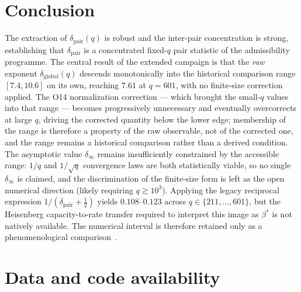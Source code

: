 \documentclass[11pt,a4paper]{article}
\theoremstyle{definition}
\newcommand{\dpair}{\delta_{\mathrm{pair}}}
\newcommand{\bstar}{\beta^{*}}
\begin{document}
  \section{Conclusion}

    The extraction of $\dpair(q)$ is robust and the inter-pair concentration is strong,
    establishing that $\dpair$ is a concentrated fixed-$q$ pair statistic of the admissibility
    programme.
    The central result of the extended campaign is that the \emph{raw} exponent
    $\delta_{\mathrm{global}}(q)$ descends monotonically into the historical comparison range
    $[7.4, 10.6]$ on its own, reaching $7.61$ at $q = 601$, with no finite-size correction applied.
    The O14 normalization correction --- which brought the small-$q$ values into that range ---
    becomes progressively unnecessary and eventually overcorrects at large $q$, driving the
    corrected quantity below the lower edge; membership of the range is therefore a property of
    the raw observable, not of the corrected one, and the range remains a historical comparison
    rather than a derived condition.
    The asymptotic value $\delta_\infty$ remains insufficiently constrained by the accessible
    range: $1/q$ and $1/\sqrt{q}$ convergence laws are both statistically viable, so no single
    $\delta_\infty$ is claimed, and the discrimination of the finite-size form is left as the open
    numerical direction (likely requiring $q \gtrsim 10^3$).
    Applying the legacy reciprocal expression $1/(\dpair + \tfrac12)$ yields
    $0.108$--$0.123$ across $q \in \{211, \dots, 601\}$, but the Heisenberg
    capacity-to-rate transfer required to interpret this image as $\bstar$ is not natively
    available.  The numerical interval is therefore retained only as a phenomenological
    comparison~\cite{Beau2026sgn}.

  \section*{Data and code availability}
\end{document}
